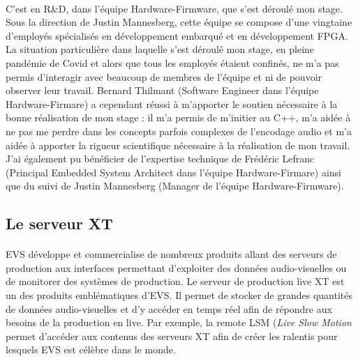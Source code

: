 \documentclass{article}
\begin{document}
    \paragraph{}
    C'est en R\&D, dans l'équipe Hardware-Firmware, que s'est déroulé mon stage. Sous la direction de Justin Mannesberg, cette équipe se compose d'une vingtaine d'employés spécialisés en développement embarqué et en développement FPGA. La situation particulière dans laquelle s'est déroulé mon stage, en pleine pandémie de Covid et alors que tous les employés étaient confinés, ne m'a pas permis d'interagir avec beaucoup de membres de l'équipe et ni de pouvoir observer leur travail. Bernard Thilmant (Software Engineer dans l'équipe Hardware-Firmare) a cependant réussi à m'apporter le soutien nécessaire à la bonne réalisation de mon stage : il m'a permis de m'initier au C++, m'a aidée à ne pas me perdre dans les concepts parfois complexes de l'encodage audio et m'a aidée à apporter la rigueur scientifique nécessaire à la réalisation de mon travail. J'ai également pu bénéficier de l'expertise technique de Frédéric Lefranc (Principal Embedded System Architect dans l'équipe Hardware-Firmare) ainsi que du suivi de Justin Mannesberg (Manager de l'équipe Hardware-Firmware).

    \subsection{Le serveur XT}
    \paragraph{}
    EVS développe et commercialise de nombreux produits allant des serveurs de production aux interfaces permettant d'exploiter des données audio-visuelles ou de monitorer des systèmes de production\cite{EVS:products}. Le serveur de production live XT est un des produits emblématiques d'EVS. Il permet de stocker de grandes quantités de données audio-visuelles et d'y accéder en temps réel afin de répondre aux besoins de la production en live. Par exemple, la remote LSM (\emph{Live Slow Motion} permet d'accéder aux contenus des serveurs XT afin de créer les ralentis pour lesquels EVS est célèbre dans le monde.
\end{document}
